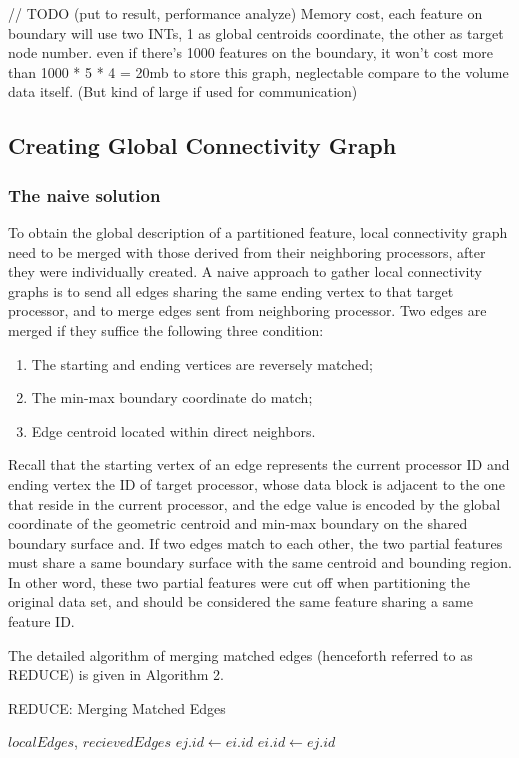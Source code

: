 \documentclass[10pt, conference, compsocconf]{IEEEtran}
\begin{document}
// TODO (put to result, performance analyze)
Memory cost, each feature on boundary will use two INTs, 1 as global centroids coordinate, the other as target node number. even if there's 1000 features on the boundary, it won’t cost more than 1000 * 5 * 4 = 20mb to store this graph, neglectable compare to the volume data itself. (But kind of large if used for communication)

\subsection{Creating Global Connectivity Graph}
\subsubsection{The naive solution}
To obtain the global description of a partitioned feature, local connectivity graph need to be merged with those derived from their neighboring processors, after they were individually created. A naive approach to gather local connectivity graphs is to send all edges sharing the same ending vertex to that target processor, and to merge edges sent from neighboring processor. Two edges are merged if they suffice the following three condition:

\begin{enumerate}
\item The starting and ending vertices are reversely matched;
\item The min-max boundary coordinate do match;
\item Edge centroid located within direct neighbors.
\end{enumerate}

Recall that the starting vertex of an edge represents the current processor ID and ending vertex the ID of target processor, whose data block is adjacent to the one that reside in the current processor, and the edge value is encoded by the global coordinate of the geometric centroid and min-max boundary on the shared boundary surface and. If two edges match to each other, the two partial features must share a same boundary surface with the same centroid and bounding region. In other word, these two partial features were cut off when partitioning the original data set, and should be considered the same feature sharing a same feature ID.

The detailed algorithm of merging matched edges (henceforth referred to as REDUCE) is given in Algorithm 2.
\begin{algorithm}
\caption{REDUCE: Merging Matched Edges}
\begin{algorithmic}[1]
\REQUIRE $localEdges$, $recievedEdges$
				\STATE $ej.id \leftarrow ei.id$
			\ELSE
				\STATE $ei.id \leftarrow ej.id$
			\ENDIF
		\ENDIF
	\ENDFOR	
\ENDFOR	
\end{algorithmic}
\end{algorithm}
\end{document}
